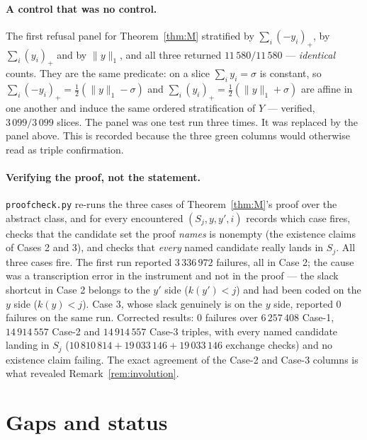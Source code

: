 \documentclass[11pt]{article}
\theoremstyle{plain}
\theoremstyle{definition}
\newcommand{\pospart}[1]{\left(#1\right)_{+}}
\begin{document}
\paragraph{A control that was no control.} The first refusal panel for
Theorem~\ref{thm:M} stratified by $\sum_i\pospart{-y_i}$, by $\sum_i\pospart{y_i}$ and by
$\|y\|_1$, and all three returned $11\,580/11\,580$ --- \emph{identical} counts. They are
the same predicate: on a slice $\sum_i y_i=\sigma$ is constant, so
$\sum_i\pospart{-y_i}=\tfrac12(\|y\|_1-\sigma)$ and
$\sum_i\pospart{y_i}=\tfrac12(\|y\|_1+\sigma)$ are affine in one another and induce the
same ordered stratification of $Y$ --- verified, $3\,099/3\,099$ slices. The panel was one
test run three times. It was replaced by the panel above. This is recorded because the
three green columns would otherwise read as triple confirmation.

\paragraph{Verifying the proof, not the statement.} \texttt{proofcheck.py} re-runs the
three cases of Theorem~\ref{thm:M}'s proof over the abstract class, and for every
encountered $(S_j,y,y',i)$ records which case fires, checks that the candidate set the
proof \emph{names} is nonempty (the existence claims of Cases 2 and 3), and checks that
\emph{every} named candidate really lands in $S_j$. All three cases fire. The first run
reported $3\,336\,972$ failures, all in Case 2; the cause was a transcription error in the
instrument and not in the proof --- the slack shortcut in Case 2 belongs to the $y'$ side
($k(y')<j$) and had been coded on the $y$ side ($k(y)<j$). Case 3, whose slack genuinely
is on the $y$ side, reported $0$ failures on the same run. Corrected results: $0$ failures over $6\,257\,408$ Case-1, $14\,914\,557$ Case-2 and
$14\,914\,557$ Case-3 triples, with every named candidate landing in $S_j$
($10\,810\,814+19\,033\,146+19\,033\,146$ exchange checks) and no existence claim failing.
The exact agreement of the Case-2 and Case-3 columns is what revealed
Remark~\ref{rem:involution}.

\section{Gaps and status}\label{sec:gaps}
\end{document}
